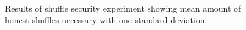 \begin{figure}[!htb]
    \centering
    \\[-2pt]
    \\[-2pt]
    \\[-2pt]
    \caption{Results of shuffle security experiment showing mean amount of honest shuffles necessary with one standard deviation}%
    \label{fig:shufflesecurity}%
\end{figure}

